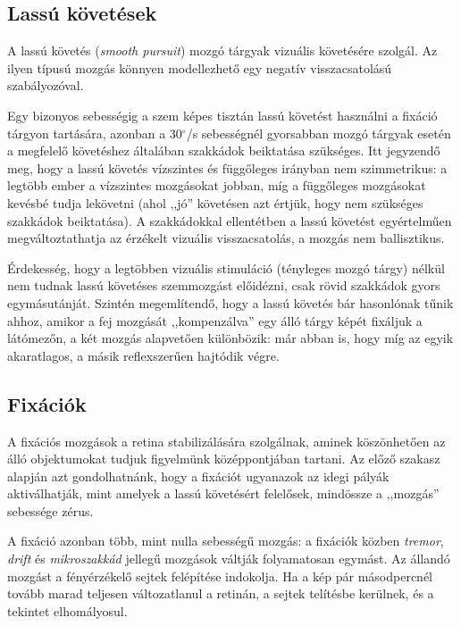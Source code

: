 \subsection{Lassú követések}\label{sect:lassukovetes}

A lassú követés (\emph{smooth pursuit}) mozgó tárgyak vizuális követésére szolgál. Az ilyen típusú mozgás könnyen modellezhető egy negatív visszacsatolású szabályozóval. \cite{carpenter_book}

Egy bizonyos sebességig a szem képes tisztán lassú követést használni a fixáció tárgyon tartására, azonban a 30$^{\circ}$/s sebességnél gyorsabban mozgó tárgyak esetén a megfelelő követéshez általában szakkádok beiktatása szükséges. Itt jegyzendő meg, hogy a lassú követés vízszintes és függőleges irányban nem szimmetrikus: a legtöbb ember a vízszintes mozgásokat jobban, míg a függőleges mozgásokat kevésbé tudja lekövetni (ahol ,,jó'' követésen azt értjük, hogy nem szükséges szakkádok beiktatása). A szakkádokkal ellentétben a lassú követést egyértelműen megváltoztathatja az érzékelt vizuális visszacsatolás, a mozgás nem ballisztikus.

Érdekesség, hogy a legtöbben vizuális stimuláció (tényleges mozgó tárgy) nélkül nem tudnak lassú követéses szemmozgást előidézni, csak rövid szakkádok gyors egymásutánját. Szintén megemlítendő, hogy a lassú követés bár hasonlónak tűnik ahhoz, amikor a fej mozgását ,,kompenzálva'' egy álló tárgy képét fixáljuk a látómezőn, a két mozgás alapvetően különbözik: már abban is, hogy míg az egyik akaratlagos, a másik reflexszerűen hajtódik végre.

\subsection{Fixációk}\label{sect:fixaciok}

A fixációs mozgások a retina stabilizálására szolgálnak, aminek köszönhetően az álló objektumokat tudjuk figyelmünk középpontjában tartani. Az előző szakasz alapján azt gondolhatnánk, hogy a fixációt ugyanazok az idegi pályák aktiválhatják, mint amelyek a lassú követésért felelősek, mindössze a ,,mozgás'' sebessége zérus.

A fixáció azonban több, mint nulla sebességű mozgás: a fixációk közben \emph{tremor}, \emph{drift} és \emph{mikroszakkád} jellegű mozgások váltják folyamatosan egymást. Az állandó mozgást a fényérzékelő sejtek felépítése indokolja. Ha a kép pár másodpercnél tovább marad teljesen változatlanul a retinán, a sejtek telítésbe kerülnek, és a tekintet elhomályosul.

